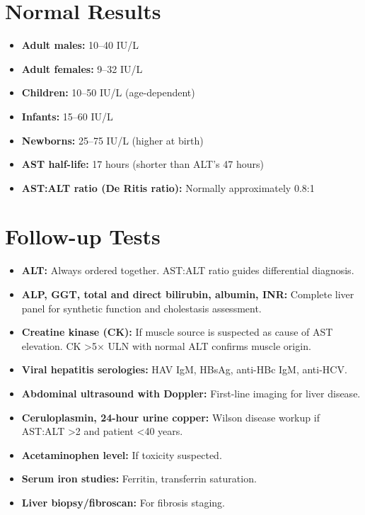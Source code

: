 \section*{Normal Results}
\begin{itemize}
  \item \textbf{Adult males:} 10--40 IU/L
  \item \textbf{Adult females:} 9--32 IU/L
  \item \textbf{Children:} 10--50 IU/L (age-dependent)
  \item \textbf{Infants:} 15--60 IU/L
  \item \textbf{Newborns:} 25--75 IU/L (higher at birth)
  \item \textbf{AST half-life:} 17 hours (shorter than ALT's 47 hours)
  \item \textbf{AST:ALT ratio (De Ritis ratio):} Normally approximately 0.8:1
\end{itemize}

\section*{Follow-up Tests}
\begin{itemize}
  \item \textbf{ALT:} Always ordered together. AST:ALT ratio guides differential diagnosis.
  \item \textbf{ALP, GGT, total and direct bilirubin, albumin, INR:} Complete liver panel for synthetic function and cholestasis assessment.
  \item \textbf{Creatine kinase (CK):} If muscle source is suspected as cause of AST elevation. CK >5$\times$ ULN with normal ALT confirms muscle origin.
  \item \textbf{Viral hepatitis serologies:} HAV IgM, HBsAg, anti-HBc IgM, anti-HCV.
  \item \textbf{Abdominal ultrasound with Doppler:} First-line imaging for liver disease.
  \item \textbf{Ceruloplasmin, 24-hour urine copper:} Wilson disease workup if AST:ALT >2 and patient <40 years.
  \item \textbf{Acetaminophen level:} If toxicity suspected.
  \item \textbf{Serum iron studies:} Ferritin, transferrin saturation.
  \item \textbf{Liver biopsy/fibroscan:} For fibrosis staging.
\end{itemize}

